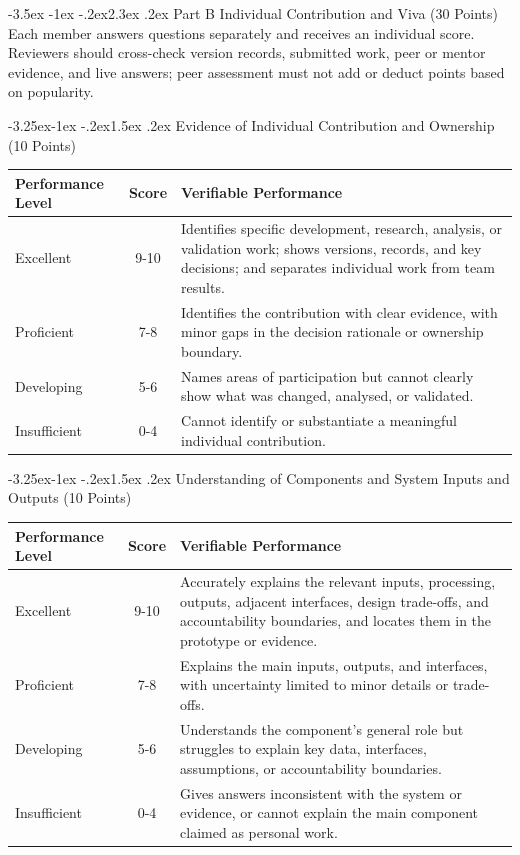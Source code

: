 \documentclass[11pt]{article}
\makeatletter
\renewcommand\section{\@startsection{section}{1}{\z@}%
    {-3.5ex \@plus -1ex \@minus -.2ex}{2.3ex \@plus.2ex}%
    {\normalfont\Large\sffamily\bfseries}}
\renewcommand\subsection{\@startsection{subsection}{2}{\z@}%
    {-3.25ex\@plus -1ex \@minus -.2ex}{1.5ex \@plus .2ex}%
    {\normalfont\large\sffamily\bfseries}}
\newcommand{\formaltable}{%
  \small
  \setlength{\tabcolsep}{5pt}%
  \renewcommand{\arraystretch}{1.2}%
  \setlength{\arrayrulewidth}{0.4pt}%
}
\renewcommand{\arraystretch}{1.2}
\makeatother
\begin{document}
\section{Part B Individual Contribution and Viva (30 Points)}
Each member answers questions separately and receives an individual score. Reviewers should cross-check version records, submitted work, peer or mentor evidence, and live answers; peer assessment must not add or deduct points based on popularity.

\subsection{Evidence of Individual Contribution and Ownership (10 Points)}
\begin{center}
\formaltable
\begin{tabularx}{\textwidth}{|l|c|Y|}
\hline
\textbf{Performance Level} & \textbf{Score} & \textbf{Verifiable Performance} \\ \hline
Excellent & 9-10 & Identifies specific development, research, analysis, or validation work; shows versions, records, and key decisions; and separates individual work from team results. \\ \hline
Proficient & 7-8 & Identifies the contribution with clear evidence, with minor gaps in the decision rationale or ownership boundary. \\ \hline
Developing & 5-6 & Names areas of participation but cannot clearly show what was changed, analysed, or validated. \\ \hline
Insufficient & 0-4 & Cannot identify or substantiate a meaningful individual contribution. \\ \hline
\end{tabularx}
\end{center}

\subsection{Understanding of Components and System Inputs and Outputs (10 Points)}
\begin{center}
\formaltable
\begin{tabularx}{\textwidth}{|l|c|Y|}
\hline
\textbf{Performance Level} & \textbf{Score} & \textbf{Verifiable Performance} \\ \hline
Excellent & 9-10 & Accurately explains the relevant inputs, processing, outputs, adjacent interfaces, design trade-offs, and accountability boundaries, and locates them in the prototype or evidence. \\ \hline
Proficient & 7-8 & Explains the main inputs, outputs, and interfaces, with uncertainty limited to minor details or trade-offs. \\ \hline
Developing & 5-6 & Understands the component's general role but struggles to explain key data, interfaces, assumptions, or accountability boundaries. \\ \hline
Insufficient & 0-4 & Gives answers inconsistent with the system or evidence, or cannot explain the main component claimed as personal work. \\ \hline
\end{tabularx}
\end{center}
\end{document}
